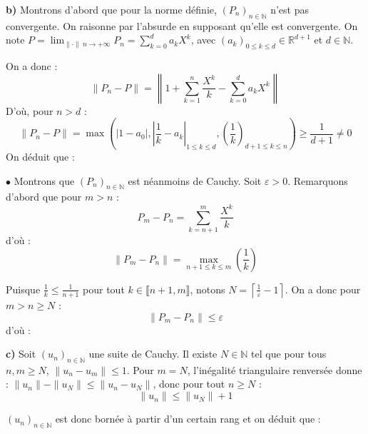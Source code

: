 \documentclass[11pt,a4paper]{article}
\begin{document}
\vspace{0.5cm}

\noindent \textbf{b)} Montrons d'abord que pour la norme définie, $(P_n)_{n \in \mathbb{N}}$ n'est pas convergente. On raisonne par l'absurde en supposant qu'elle est convergente. On note $P = \lim_{\|\cdot\| \ n \to +\infty} P_n = \sum_{k=0}^d a_k X^k$, avec $(a_k)_{0 \leqslant k \leqslant d} \in \mathbb{R}^{d+1}$ et $d \in \mathbb{N}$.

\noindent On a donc :
$$ \|P_n - P\| = \left\| 1 + \sum_{k=1}^n \frac{X^k}{k} - \sum_{k=0}^d a_k X^k \right\| $$
\noindent D'où, pour $n > d$ : 
$$ \|P_n - P\| = \max \left( |1-a_0|, \left| \frac{1}{k} - a_k \right| _{1 \leqslant k \leqslant d}, \left( \frac{1}{k} \right)_{d+1 \leqslant k \leqslant n} \right) \geqslant \frac{1}{d+1} \neq 0 $$
\noindent On déduit que :
\begin{center}
\end{center}

\noindent $\bullet$ Montrons que $(P_n)_{n \in \mathbb{N}}$ est néanmoins de Cauchy. Soit $\varepsilon > 0$. Remarquons d'abord que pour $m > n$ :
$$ P_m - P_n = \sum_{k=n+1}^m \frac{X^k}{k} $$
\noindent d'où :
$$ \|P_m - P_n\| = \max_{n+1 \leqslant k \leqslant m} \left( \frac{1}{k} \right) $$

\noindent Puisque $\frac{1}{k} \leqslant \frac{1}{n+1}$ pour tout $k \in \llbracket n+1, m \rrbracket$, notons $N = \left\lceil \frac{1}{\varepsilon} - 1 \right\rceil$. On a donc pour $m > n \geqslant N$ :
$$ \|P_m - P_n\| \leqslant \varepsilon $$
\noindent d'où :
\begin{center}
\end{center}

\vspace{0.5cm}

\noindent \textbf{c)} Soit $(u_n)_{n \in \mathbb{N}}$ une suite de Cauchy. Il existe $N \in \mathbb{N}$ tel que pour tous $n,m \geqslant N$, $\|u_n - u_m\| \leqslant 1$. Pour $m = N$, l'inégalité triangulaire renversée donne : $\|u_n\| - \|u_N\| \leqslant \|u_n - u_N\|$, donc pour tout $n \geqslant N$ :
$$ \boxed{ \|u_n\| \leqslant \|u_N\| + 1 } $$

\noindent $(u_n)_{n \in \mathbb{N}}$ est donc bornée à partir d'un certain rang et on déduit que :
\begin{center}
\end{center}
\end{document}

